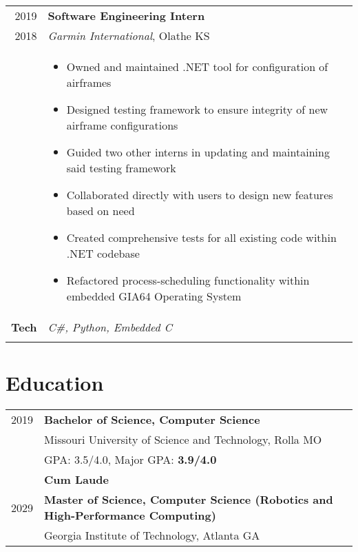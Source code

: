 \documentclass[a4paper,10pt]{article}
\newcommand{\br}{\\\multicolumn{2}{c}{}}
\begin{document}
\begin{tabular}{r|p{15cm}}
  \textsc{2019} & \textbf{Software Engineering Intern} \\
  \textsc{2018} & \textit{Garmin International}, Olathe KS
  \\ &
       \begin{itemize}
       \item Owned and maintained .NET tool for configuration of airframes
       \item Designed testing framework to ensure integrity of new airframe configurations
       \item Guided two other interns in updating and maintaining said testing framework
       \item Collaborated directly with users to design new features based on need
       \item Created comprehensive tests for all existing code within .NET codebase
       \item Refactored process-scheduling functionality within embedded GIA64 Operating System

       \end{itemize} \\
  \textbf{Tech} & \textit{C\#, Python, Embedded C} \br \\
\end{tabular}


\section{Education}
\begin{tabular}{r p{15cm}}
  \textsc{2019} & \textbf{Bachelor of Science, Computer Science} \\
                & Missouri University of Science and Technology, Rolla MO  \\
                & GPA: 3.5/4.0, Major GPA: \textbf{3.9/4.0} \\
                & \textbf{Cum Laude} \\
  \textsc{2029} & \textbf{Master of Science, Computer Science (Robotics and High-Performance Computing)} \\
                & Georgia Institute of Technology, Atlanta GA
\end{tabular}
\end{document}

